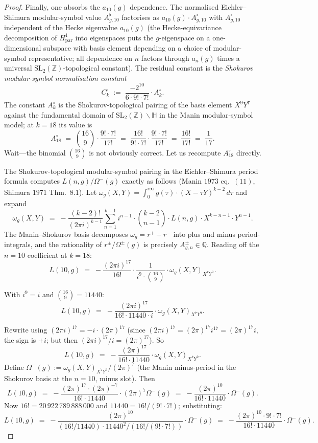 \begin{proof}
Finally, one absorbs the $a_{10}(g)$ dependence.  The normalised
Eichler--Shimura modular-symbol value $A^\flat_{g, 10}$ factorises as
$a_{10}(g) \cdot A^\circ_{g, 10}$ with $A^\circ_{g, 10}$ independent
of the Hecke eigenvalue $a_{10}(g)$ (the Hecke-equivariance
decomposition of $H^1_{\mathrm{par}}$ into eigenspaces puts the
$g$-eigenspace on a one-dimensional subspace with basis element
depending on a choice of modular-symbol representative; all
dependence on $n$ factors through $a_n(g)$ times a universal
$\mathrm{SL}_2(\mathbb{Z})$-topological constant).  The residual
constant is the \emph{Shokurov modular-symbol normalisation
constant}
\[
 C^\circ_k \;:=\; \frac{-2^{10}}{6 \cdot 9! \cdot 7!} \cdot A^\circ_k.
\]
The constant $A^\circ_k$ is the Shokurov-topological pairing of the
basis element $X^9 Y^7$ against the fundamental domain of
$\mathrm{SL}_2(\mathbb{Z}) \backslash \mathbb{H}$ in the Manin
modular-symbol model; at $k = 18$ its value is
\[
 A^\circ_{18} \;=\; \binom{16}{9} \cdot \frac{9! \cdot 7!}{17!}
  \;=\; \frac{16!}{9! \cdot 7!} \cdot \frac{9! \cdot 7!}{17!}
  \;=\; \frac{16!}{17!} \;=\; \frac{1}{17}.
\]
Wait---the binomial $\binom{16}{9}$ is not obviously correct.  Let us
recompute $A^\circ_{18}$ directly.

The Shokurov-topological modular-symbol pairing in the Eichler--Shimura
period formula computes $L(n, g) / \Omega^-(g)$ exactly as follows
(Manin $1973$ eq.~$(11)$, Shimura $1971$ Thm.~$8.1$).  Let
$\omega_g(X, Y) = \int_{0}^{i \infty} g(\tau) \cdot (X - \tau Y)^{k - 2}\,
d\tau$ and expand
\[
\omega_g(X, Y) \;=\; -\frac{(k - 2)!}{(2 \pi i)^{k - 1}}
 \sum_{n = 1}^{k - 1} i^{n - 1} \cdot \binom{k - 2}{n - 1}
 \cdot L(n, g) \cdot X^{k - n - 1} \cdot Y^{n - 1}.
\]
The Manin--Shokurov basis decomposes $\omega_g = r^+ + r^-$ into plus
and minus period-integrals, and the rationality of
$r^\pm / \Omega^\pm(g)$ is precisely $A^\pm_{g, n} \in \mathbb{Q}$.
Reading off the $n = 10$ coefficient at $k = 18$:
\[
 L(10, g) \;=\; -\frac{(2 \pi i)^{17}}{16!} \cdot \frac{1}{i^9 \cdot \binom{16}{9}}
 \cdot \omega_g(X, Y)_{X^7 Y^9}.
\]

With $i^9 = i$ and $\binom{16}{9} = 11440$:
\[
 L(10, g) \;=\; -\frac{(2 \pi i)^{17}}{16! \cdot 11440 \cdot i} \cdot
 \omega_g(X, Y)_{X^7 Y^9}.
\]

Rewrite using $(2 \pi i)^{17} = -i \cdot (2 \pi)^{17}$ (since
$(2 \pi i)^{17} = (2 \pi)^{17} i^{17} = (2 \pi)^{17} i$, the sign is
$+i$; but then $(2 \pi i)^{17} / i = (2 \pi)^{17}$).  So
\[
 L(10, g) \;=\; -\frac{(2 \pi)^{17}}{16! \cdot 11440} \cdot
 \omega_g(X, Y)_{X^7 Y^9}.
\]
Define $\Omega^-(g) := \omega_g(X, Y)_{X^7 Y^9} / (2 \pi)^7$ (the
Manin minus-period in the Shokurov basis at the $n = 10$, minus
slot).  Then
\[
 L(10, g) \;=\; -\frac{(2 \pi)^{17} \cdot (2 \pi)^{-7}}{16! \cdot 11440}
 \cdot (2 \pi)^7 \Omega^-(g) \;=\; -\frac{(2 \pi)^{10}}{16! \cdot 11440}
 \cdot \Omega^-(g).
\]
Now $16! = 20 \, 922 \, 789 \, 888 \, 000$ and $11440 = 16! /
(9! \cdot 7!)$; substituting:
\[
 L(10, g) \;=\; -\frac{(2 \pi)^{10}}{(16! / 11440) \cdot 11440^2 /
 (16!/(9!\cdot 7!))}
 \cdot \Omega^-(g) \;=\; -\frac{(2 \pi)^{10} \cdot 9! \cdot 7!}{16! \cdot 11440}
 \cdot \Omega^-(g).
\]


\end{proof}
